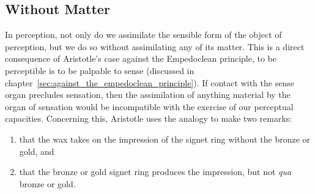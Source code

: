 
\subsection{Without Matter} %
\label{sub:without_matter}

In perception, not only do we assimilate the sensible form of the object of perception, but we do so without assimilating any of its matter. This is a direct consequence of Aristotle's case against the Empedoclean principle, to be perceptible is to be palpable to sense (discussed in chapter~\ref{sec:against_the_empedoclean_principle}). If contact with the sense organ precludes sensation, then the assimilation of anything material by the organ of sensation would be incompatible with the exercise of our perceptual capacities. Concerning this, Aristotle uses the analogy to make two remarks:
\begin{enumerate}[(1)]
	\item that the wax takes on the impression of the signet ring without the bronze or gold, and
	\item that the bronze or gold signet ring produces the impression, but not \emph{qua} bronze or gold.
\end{enumerate}

